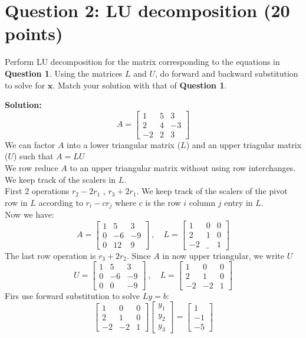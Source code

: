 \documentclass[11pt]{article}
\begin{document}
\newpage
\section*{Question 2: LU decomposition (20 points)}

Perform LU decomposition for the matrix corresponding to the equations in \textbf{Question 1}. Using the matrices $L$ and $U$, do forward and backward substitution to solve for $\mathbf{x}$. Match your solution with that of \textbf{Question 1}.

\textbf{Solution:}
$$
A=\begin{bmatrix}
    1&5&3\\
    2&4&-3\\
    -2&2&3
\end{bmatrix}
$$
We can factor $A$ into a lower triangular matrix ($L$) and an upper triagular matrix ($U$) such that $A=LU$\\
We row reduce $A$ to an upper triangular matrix without using row interchanges.\\
We keep track of the scalers in $L$.\\
\bigskip
First 2 operations $r_2-2r_1$ , $r_3+2r_1$. We keep track of the scalers of the pivot row in $L$ according to
$r_i-cr_j$ where $c$ is the row $i$ column $j$ entry in $L$.\\
Now we have:
$$
A=\begin{bmatrix}
    1&5&3\\
    0&-6&-9\\
    0&12&9
\end{bmatrix}\ ,\quad L=\begin{bmatrix}
    1&0&0\\
    2&1&0\\
    -2&\_&1
\end{bmatrix} 
$$
The last row operation is $r_3+2r_2$. Since $A$ in now upper triangular, we write $U$
$$
U=\begin{bmatrix}
    1&5&3\\
    0&-6&-9\\
    0&0&-9
\end{bmatrix}\ ,\quad L=\begin{bmatrix}
    1&0&0\\
    2&1&0\\
    -2&-2&1
\end{bmatrix}
$$
\bigskip
Firs use forward substitution to solve $Ly=b$:
$$
\begin{bmatrix}
    1&0&0\\
    2&1&0\\
    -2&-2&1
\end{bmatrix}
\begin{bmatrix} y_1\\y_2\\y_3 \end{bmatrix}
=\begin{bmatrix} 1\\-1\\-5 \end{bmatrix}
$$
\end{document}

